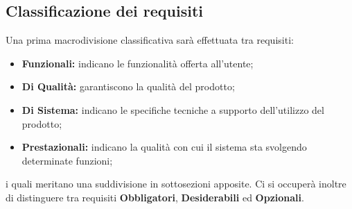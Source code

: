 \subsection{Classificazione dei requisiti}
Una prima macrodivisione classificativa sarà effettuata tra requisiti:
\begin{itemize}
    \item \textbf{Funzionali: }indicano le funzionalità offerta all'utente;
    \item \textbf{Di Qualità: }garantiscono la qualità del prodotto;
    \item \textbf{Di Sistema: }indicano le specifiche tecniche a supporto dell'utilizzo del prodotto;
    \item \textbf{Prestazionali: }indicano la qualità con cui il sistema sta svolgendo determinate funzioni;
\end{itemize}
i quali meritano una suddivisione in sottosezioni apposite.
Ci si occuperà inoltre di distinguere tra requisiti \textbf{Obbligatori}, \textbf{Desiderabili} ed \textbf{Opzionali}.

